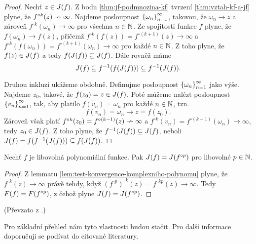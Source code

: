 \begin{proof}
    Nechť $z\in J(f)$. Z bodu \ref{thm:jf-podmnozina-kf} tvrzení \ref{thm:vztah-kf-a-jf} plyne, že $f^{\circ k}(z)\nrightarrow\infty$. Najdeme posloupnost $\left\{\omega_n\right\}_{n=1}^\infty$, takovou, že $\omega_n\to z$ a zároveň $f^{\circ k}(\omega_n)\to\infty$ pro všechna $n\in\mathbb{N}$. Ze spojitosti funkce $f$ plyne, že $f(\omega_n)\to f(z)$, přičemž $f^{\circ k}(f(z))=f^{\circ(k+1)}(z)\to\infty$ a $f^{\circ k}(f(\omega_n))=f^{\circ(k+1)}(\omega_n)\to\infty$ pro každé $n\in\mathbb{N}$. Z toho plyne, že $f(z)\in J(f)$ a tedy $f(J(f))\subseteq J(f)$. Dále rovněž máme
    \[J(f)\subseteq f^{-1}(f(J(f)))\subseteq f^{-1}(J(f)).\]

    Druhou inkluzi ukážeme obdobně. Definujme posloupnost $\left\{\omega_n\right\}_{n=1}^\infty$ jako výše. Najdeme $z_0$, takové, že $f(z_0)=z\in J(f)$. Poté můžeme nalézt posloupnost $\left\{v_n\right\}_{n=1}^\infty$, tak, aby platilo $f(v_n)=\omega_n$ pro každé $n\in\mathbb{N}$, tzn.
    \[f(v_n)=\omega_n\to z=f(z_0).\]
    Zároveň však platí $f^{\circ k}(z_0)=f^{\circ(k-1)}(z)\nrightarrow\infty$ a $f^{\circ k}(v_n)=f^{\circ(k-1)}(\omega_n)\to\infty$, tedy $z_0\in J(f)$. Z toho plyne, že $f^{-1}(J(f))\subseteq J(f)$, neboli $J(f)=f(f^{-1}(J(f)))\subseteq f(J(f))$.
\end{proof}
\begin{theorem}\label{ekvivalence-jf-a-jfp}
    Nechť $f$ je libovolná polynomiální funkce. Pak $J(f)=J(f^{\circ p})$ pro libovolné $p\in\mathbb{N}$.
\end{theorem}
\begin{proof}
    Z lemmatu \ref{lem:test-konvergence-komplexniho-polynomu} plyne, že $f^{\circ k}(z)\to\infty$ právě tehdy, když $(f^{\circ p})^{\circ k}(z)=f^{\circ kp}(z)\to\infty$. Tedy $F(f)=F(f^{\circ p})$, z čehož plyne $J(f)=J(f^{\circ p})$.
\end{proof}
(Převzato z \citep[str. 238]{Falconer1989}.)

Pro základní přehled nám tyto vlastnosti budou stačit. Pro další informace doporučuji se podívat do citované literatury.

